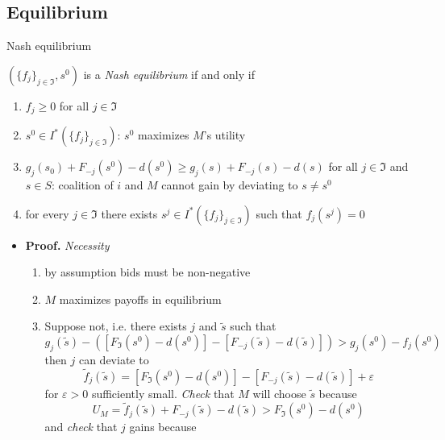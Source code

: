 \documentclass[11pt,english]{beamer}
\newcommand{\ve}{\varepsilon}
\begin{document}
\subsection{Equilibrium}

\begin{frame}[allowframebreaks]{Nash equilibrium}
\begin{lemma}
      $(\{f_j\}_{j \in \Im},s^0)$ is a \emph{Nash equilibrium} if and
      only if
      \begin{enumerate}
      \item $f_j \geq 0$ for all $j \in \Im$
      \item $s^0 \in  I^*(\{f_j\}_{j \in \Im})$: $s^0$ maximizes $M$'s utility
      \item $g_j(s_0) +F_{-j}(s^0)-d(s^0) \geq g_j(s) +F_{-j}(s)
        -d(s)$ for all $j \in \Im$ and $s \in S$: coalition of $i$ and
        $M$ cannot gain by deviating to $s \neq s^0$
      \item for every $j \in \Im$ there exists $s^j \in  I^*(\{f_j\}_{j
          \in \Im})$ such that $f_j(s^j)=0$
      \end{enumerate}
    \end{lemma}
\begin{itemize}
  \item \textbf{Proof.} \emph{Necessity}
    \begin{enumerate}
    \item by assumption bids must be non-negative
    \item $M$ maximizes payoffs in equilibrium
    \item Suppose not, i.e. there exists $j$ and $\tilde{s}$ such that
      \begin{equation} \label{eq:TildeSj}
        g_j(\tilde{s})-\left([F_{\Im}(s^0)-d(s^0)]-[F_{-j}(\tilde{s})-d(\tilde{s})] \right)
        > g_j(s^0)-f_j(s^0)
      \end{equation}
      then $j$ can deviate to
      \begin{equation*}
        \tilde{f}_j(\tilde{s})=[F_{\Im}(s^0)-d(s^0)]-[F_{-j}(\tilde{s})-d(\tilde{s})]
        + \ve
      \end{equation*}
      for $\ve>0$ sufficiently small. \emph{Check} that $M$ will choose
      $\tilde{s}$ because
      \begin{equation*}
        U_M = \tilde{f}_j(\tilde{s})+F_{-j}(\tilde{s})-d(\tilde{s}) > F_{\Im}(s^0)-d(s^0)
      \end{equation*}
       and \emph{check} that $j$ gains because
      \begin{equation*}

\end{equation*}
\end{enumerate}
\end{itemize}
\end{frame}
\end{document}
